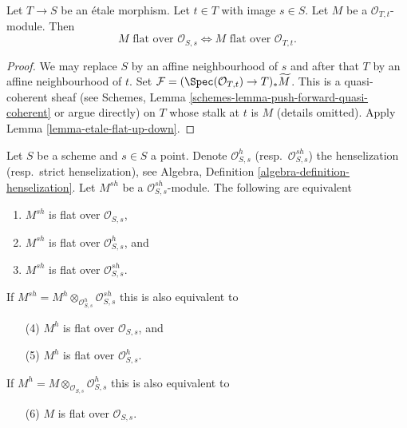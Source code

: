 \begin{lemma}
\label{lemma-etale-flat-up-down-local-ring}
Let $T \to S$ be an \'etale morphism. Let $t \in T$ with image $s \in S$.
Let $M$ be a $\mathcal{O}_{T, t}$-module. Then
$$
M\text{ flat over }\mathcal{O}_{S, s}
\Leftrightarrow
M\text{ flat over }\mathcal{O}_{T, t}.
$$
\end{lemma}

\begin{proof}
We may replace $S$ by an affine neighbourhood of $s$ and after that
$T$ by an affine neighbourhood of $t$.
Set $\mathcal{F} = (\Spec(\mathcal{O}_{T, t}) \to T)_*\widetilde M$.
This is a quasi-coherent sheaf (see
Schemes, Lemma \ref{schemes-lemma-push-forward-quasi-coherent}
or argue directly)
on $T$ whose stalk at $t$ is $M$ (details omitted).
Apply
Lemma \ref{lemma-etale-flat-up-down}.
\end{proof}

\begin{lemma}
\label{lemma-flat-up-down-henselization}
Let $S$ be a scheme and $s \in S$ a point. Denote $\mathcal{O}_{S, s}^h$
(resp.\ $\mathcal{O}_{S, s}^{sh}$) the henselization (resp.\ strict
henselization), see
Algebra, Definition \ref{algebra-definition-henselization}.
Let $M^{sh}$ be a $\mathcal{O}_{S, s}^{sh}$-module.
The following are equivalent
\begin{enumerate}
\item $M^{sh}$ is flat over $\mathcal{O}_{S, s}$,
\item $M^{sh}$ is flat over $\mathcal{O}_{S, s}^h$, and
\item $M^{sh}$ is flat over $\mathcal{O}_{S, s}^{sh}$.
\end{enumerate}
If $M^{sh} = M^h \otimes_{\mathcal{O}_{S, s}^h} \mathcal{O}_{S, s}^{sh}$
this is also equivalent to
\begin{enumerate}
\item[(4)] $M^h$ is flat over $\mathcal{O}_{S, s}$, and
\item[(5)] $M^h$ is flat over $\mathcal{O}_{S, s}^h$.
\end{enumerate}
If $M^h = M \otimes_{\mathcal{O}_{S, s}} \mathcal{O}_{S, s}^h$
this is also equivalent to
\begin{enumerate}
\item[(6)] $M$ is flat over $\mathcal{O}_{S, s}$.
\end{enumerate}
\end{lemma}

